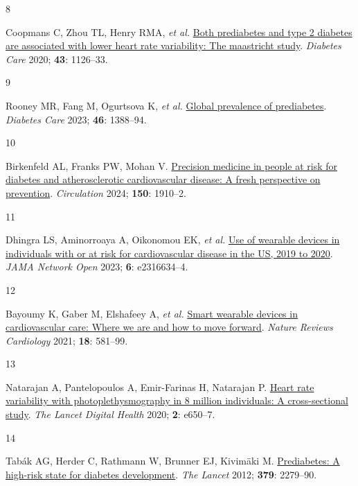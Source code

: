 \documentclass[
  a4paper,
  headsepline=true,
  open=any]{scrbook}
\newlength{\cslhangindent}
\newlength{\csllabelwidth}
\newlength{\cslentryspacingunit} %
\newenvironment{CSLReferences}[2] %
 {%
  \setlength{\parindent}{0pt}
  \ifodd #1
  \let\oldpar\par
  \def\par{\hangindent=\cslhangindent\oldpar}
  \fi
  \setlength{\parskip}{#2\cslentryspacingunit}
 }%
 {}
\newcommand{\CSLLeftMargin}[1]{\parbox[t]{\csllabelwidth}{#1}}
\newcommand{\CSLRightInline}[1]{\parbox[t]{\linewidth - \csllabelwidth}{#1}\break}
\begin{document}
\begin{CSLReferences}{0}{0}
\leavevmode{}%
\CSLLeftMargin{8 }%
\CSLRightInline{Coopmans C, Zhou TL, Henry RMA, \emph{et al.}
\href{https://doi.org/10.2337/dc19-2367}{Both prediabetes and type 2
diabetes are associated with lower heart rate variability: The
maastricht study}. \emph{Diabetes Care} 2020; \textbf{43}: 1126--33.}

\leavevmode{}%
\CSLLeftMargin{9 }%
\CSLRightInline{Rooney MR, Fang M, Ogurtsova K, \emph{et al.}
\href{https://doi.org/10.2337/dc22-2376}{Global prevalence of
prediabetes}. \emph{Diabetes Care} 2023; \textbf{46}: 1388--94.}

\leavevmode{}%
\CSLLeftMargin{10 }%
\CSLRightInline{Birkenfeld AL, Franks PW, Mohan V.
\href{https://doi.org/10.1161/CIRCULATIONAHA.124.070463}{Precision
medicine in people at risk for diabetes and atherosclerotic
cardiovascular disease: A fresh perspective on prevention}.
\emph{Circulation} 2024; \textbf{150}: 1910--2.}

\leavevmode{}%
\CSLLeftMargin{11 }%
\CSLRightInline{Dhingra LS, Aminorroaya A, Oikonomou EK, \emph{et al.}
\href{https://doi.org/10.1001/jamanetworkopen.2023.16634}{Use of
wearable devices in individuals with or at risk for cardiovascular
disease in the US, 2019 to 2020}. \emph{JAMA Network Open} 2023;
\textbf{6}: e2316634--4.}

\leavevmode{}%
\CSLLeftMargin{12 }%
\CSLRightInline{Bayoumy K, Gaber M, Elshafeey A, \emph{et al.}
\href{https://doi.org/10.1038/s41569-021-00522-7}{Smart wearable devices
in cardiovascular care: Where we are and how to move forward}.
\emph{Nature Reviews Cardiology} 2021; \textbf{18}: 581--99.}

\leavevmode{}%
\CSLLeftMargin{13 }%
\CSLRightInline{Natarajan A, Pantelopoulos A, Emir-Farinas H, Natarajan
P. \href{https://doi.org/10.1016/S2589-7500(20)30246-6}{Heart rate
variability with photoplethysmography in 8 million individuals: A
cross-sectional study}. \emph{The Lancet Digital Health} 2020;
\textbf{2}: e650--7.}

\leavevmode{}%
\CSLLeftMargin{14 }%
\CSLRightInline{Tabák AG, Herder C, Rathmann W, Brunner EJ, Kivimäki M.
\href{https://doi.org/10.1016/S0140-6736(12)60283-9}{Prediabetes: A
high-risk state for diabetes development}. \emph{The Lancet} 2012;
\textbf{379}: 2279--90.}


\end{CSLReferences}
\end{document}
